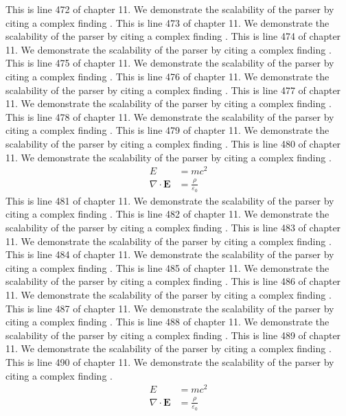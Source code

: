 This is line 472 of chapter 11. We demonstrate the scalability of the parser by citing a complex finding \cite{ref11_472}.
This is line 473 of chapter 11. We demonstrate the scalability of the parser by citing a complex finding \cite{ref11_473}.
This is line 474 of chapter 11. We demonstrate the scalability of the parser by citing a complex finding \cite{ref11_474}.
This is line 475 of chapter 11. We demonstrate the scalability of the parser by citing a complex finding \cite{ref11_475}.
This is line 476 of chapter 11. We demonstrate the scalability of the parser by citing a complex finding \cite{ref11_476}.
This is line 477 of chapter 11. We demonstrate the scalability of the parser by citing a complex finding \cite{ref11_477}.
This is line 478 of chapter 11. We demonstrate the scalability of the parser by citing a complex finding \cite{ref11_478}.
This is line 479 of chapter 11. We demonstrate the scalability of the parser by citing a complex finding \cite{ref11_479}.
This is line 480 of chapter 11. We demonstrate the scalability of the parser by citing a complex finding \cite{ref11_480}.
\begin{align*}
  E &= mc^2 \\
  \nabla \cdot \mathbf{E} &= \frac{\rho}{\varepsilon_0}
\end{align*}
This is line 481 of chapter 11. We demonstrate the scalability of the parser by citing a complex finding \cite{ref11_481}.
This is line 482 of chapter 11. We demonstrate the scalability of the parser by citing a complex finding \cite{ref11_482}.
This is line 483 of chapter 11. We demonstrate the scalability of the parser by citing a complex finding \cite{ref11_483}.
This is line 484 of chapter 11. We demonstrate the scalability of the parser by citing a complex finding \cite{ref11_484}.
This is line 485 of chapter 11. We demonstrate the scalability of the parser by citing a complex finding \cite{ref11_485}.
This is line 486 of chapter 11. We demonstrate the scalability of the parser by citing a complex finding \cite{ref11_486}.
This is line 487 of chapter 11. We demonstrate the scalability of the parser by citing a complex finding \cite{ref11_487}.
This is line 488 of chapter 11. We demonstrate the scalability of the parser by citing a complex finding \cite{ref11_488}.
This is line 489 of chapter 11. We demonstrate the scalability of the parser by citing a complex finding \cite{ref11_489}.
This is line 490 of chapter 11. We demonstrate the scalability of the parser by citing a complex finding \cite{ref11_490}.
\begin{align*}
  E &= mc^2 \\
  \nabla \cdot \mathbf{E} &= \frac{\rho}{\varepsilon_0}
\end{align*}
